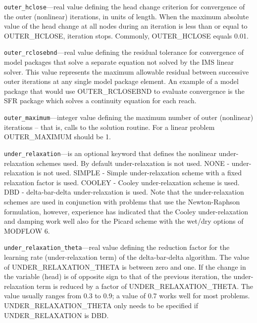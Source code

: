 \begin{description}
\item \texttt{outer\_hclose}---real value defining the head change criterion for convergence of the outer (nonlinear) iterations, in units of length. When the maximum absolute value of the head change at all nodes during an iteration is less than or equal to OUTER\_HCLOSE, iteration stops. Commonly, OUTER\_HCLOSE equals 0.01.

\item \texttt{outer\_rclosebnd}---real value defining the residual tolerance for convergence of model packages that solve a separate equation not solved by the IMS linear solver. This value represents the maximum allowable residual between successive outer iterations at any single model package element. An example of a model package that would use OUTER\_RCLOSEBND to evaluate convergence is the SFR package which solves a continuity equation for each reach.

\item \texttt{outer\_maximum}---integer value defining the maximum number of outer (nonlinear) iterations -- that is, calls to the solution routine. For a linear problem OUTER\_MAXIMUM should be 1.

\item \texttt{under\_relaxation}---is an optional keyword that defines the nonlinear under-relaxation schemes used. By default under-relaxation is not used.  NONE - under-relaxation is not used. SIMPLE - Simple under-relaxation scheme with a fixed relaxation factor is used.  COOLEY - Cooley under-relaxation scheme is used.  DBD - delta-bar-delta under-relaxation is used.  Note that the under-relaxation schemes are used in conjunction with problems that use the Newton-Raphson formulation, however, experience has indicated that the Cooley under-relaxation and damping work well also for the Picard scheme with the wet/dry options of MODFLOW 6.

\item \texttt{under\_relaxation\_theta}---real value defining the reduction factor for the learning rate (under-relaxation term) of the delta-bar-delta algorithm. The value of UNDER\_RELAXATION\_THETA is between zero and one. If the change in the variable (head) is of opposite sign to that of the previous iteration, the under-relaxation term is reduced by a factor of UNDER\_RELAXATION\_THETA. The value usually ranges from 0.3 to 0.9; a value of 0.7 works well for most problems. UNDER\_RELAXATION\_THETA only needs to be specified if UNDER\_RELAXATION is DBD.


\end{description}
